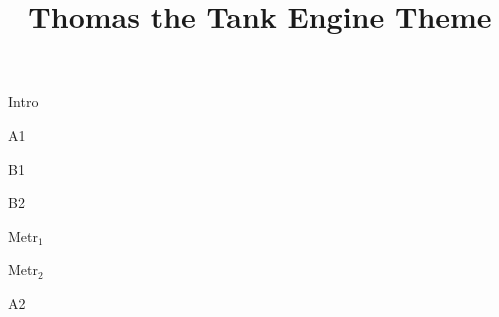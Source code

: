 \documentclass[timestamp]{jazzgrid}
\title{Thomas the Tank Engine Theme}
\begin{document}
\maketitle

\begin{musicsection}{Intro}
	{}
	{\barfour{}{}{}{}{}}
\end{musicsection}

\begin{musicsection}{A1}
\barline
	{}
	{}
	{}
	{}
\barline
	{}
	{}
	{}
	{}
\end{musicsection}

\begin{musicsection}{B1}
\barline
	{}
	{}
	{}
	{}
	{}
	{}
	{}
\end{musicsection}

\begin{musicsection}{B2}
\barline
	{}
	{}
	{}
	{}
\barline
	{}
	{}
	{}
	{}
\end{musicsection}

\begin{musicsection}{Metr$_{1}$}
\barline
	{}
	{}
	{}
	{}
\end{musicsection}

\begin{musicsection}{Metr$_{2}$}
\barline
	{}
	{}
	{}
	{}
\end{musicsection}

\begin{musicsection}{A2}
\barline
	{}
	{}
	{}
	{}
\barline
	{}
	{}
	{}
	{}
\end{musicsection}
\end{document}
